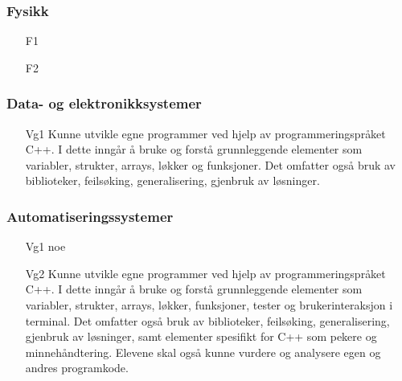 	\subsubsection*{Fysikk}

		\begin{itemize}

			\item[F1]
			\item[F2]

		\end{itemize}

	\subsubsection*{Data- og elektronikksystemer}

		\begin{itemize}

			\item[Vg1] Kunne utvikle egne programmer ved hjelp av programmeringspråket C++. I dette inngår å bruke og forstå grunnleggende elementer som variabler, strukter, arrays, løkker og funksjoner. Det omfatter også bruk av biblioteker, feilsøking, generalisering, gjenbruk av løsninger.

		\end{itemize}


	\subsubsection*{Automatiseringssystemer}

		\begin{itemize}

			\item[Vg1] noe

			\item[Vg2] Kunne utvikle egne programmer ved hjelp av programmeringspråket C++. I dette inngår å bruke og forstå grunnleggende elementer som variabler, strukter, arrays, løkker, funksjoner, tester og brukerinteraksjon i terminal. Det omfatter også bruk av biblioteker, feilsøking, generalisering, gjenbruk av løsninger, samt elementer spesifikt for C++ som pekere og minnehåndtering. Elevene skal også kunne vurdere og analysere egen og andres programkode.

		\end{itemize}
